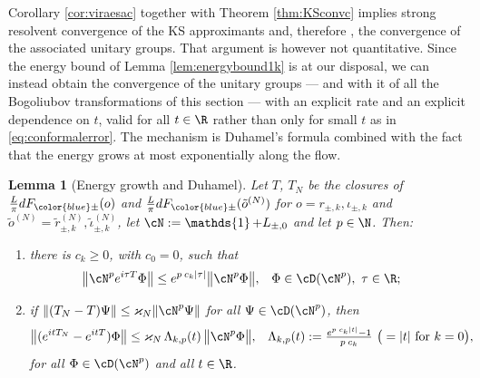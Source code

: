 \documentclass[a4paper, 11pt]{article}
\DeclareMathOperator{\1}{\mathds{1}}
\newtheorem{lemma}[thm]{Lemma}
\begin{document}
Corollary \ref{cor:viraesac} together with Theorem \ref{thm:KSconvc} implies strong resolvent convergence of the KS approximants and, therefore \cite{ReedMethodsOfModern1}, the convergence of the associated unitary groups. That argument is however not quantitative. Since the energy bound of Lemma \ref{lem:energybound1k} is at our disposal, we can instead obtain the convergence of the unitary groups --- and with it of all the Bogoliubov transformations of this section --- with an explicit rate and an explicit dependence on $t$, valid for all $t\in\R$ rather than only for small $t$ as in \eqref{eq:conformalerror}. The mechanism is Duhamel's formula combined with the fact that the energy grows at most exponentially along the flow.

\begin{lemma}[Energy growth and Duhamel]
\label{lem:duhamel}
Let $T$, $T_{N}$ be the closures of $\tfrac{L}{\pi}dF_{{\color{blue}\pm}}(o)$ and $\tfrac{L}{\pi}dF_{{\color{blue}\pm}}(\tilde{o}^{(N)})$ for $o=r_{\pm,k},\iota_{\pm,k}$ and $\tilde{o}^{(N)}=\tilde{r}^{(N)}_{\pm,k},\tilde{\iota}^{(N)}_{\pm,k}$, let $\cN:=\1+L_{\pm,0}$ and let $p\in\N$. Then:
\begin{enumerate}
\item[(i)] there is $c_{k}\geq0$, with $c_{0}=0$, such that
\begin{align}
\label{eq:energygrowth}
\big\|\cN^{p}e^{i\tau T}\Phi\big\| & \leq e^{p\!\ c_{k}|\tau|}\big\|\cN^{p}\Phi\big\|, & \Phi & \in\cD(\cN^{p}),\ \tau\in\R;
\end{align}
\item[(ii)] if $\|(T_{N}-T)\Psi\|\leq\varkappa_{N}\|\cN^{p}\Psi\|$ for all $\Psi\in\cD(\cN^{p})$, then
\begin{align}
\label{eq:duhamel}
\big\|(e^{itT_{N}}-e^{itT})\Phi\big\| & \leq \varkappa_{N}\!\ \Lambda_{k,p}(t)\!\ \big\|\cN^{p}\Phi\big\|, & \Lambda_{k,p}(t) & := \tfrac{e^{p\!\ c_{k}|t|}-1}{p\!\ c_{k}} \ \big(=|t|\textup{ for }k=0\big),
\end{align}
for all $\Phi\in\cD(\cN^{p})$ and all $t\in\R$.
\end{enumerate}
\end{lemma}
\end{document}
